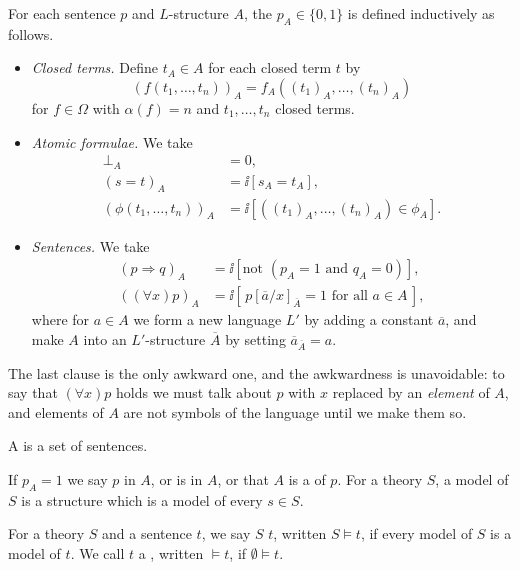 \documentclass[a4paper]{scrartcl}
\begin{document}
\begin{definition}[Interpretation]
  For each sentence $p$ and $L$-structure $A$, the  $p_A \in \{0, 1\}$ is defined inductively as follows.
  \begin{itemize}
    \item \emph{Closed terms.} Define $t_A \in A$ for each closed term $t$ by
    $$
    (f(t_1, \dots, t_n))_A = f_A((t_1)_A, \dots, (t_n)_A)
    $$
    for $f \in \Omega$ with $\alpha(f) = n$ and $t_1, \dots, t_n$ closed terms.
    \item \emph{Atomic formulae.} We take
    \begin{align*}
      \bot_A &= 0,\\
      (s = t)_A &= \ii[s_A = t_A],\\
      (\phi(t_1, \dots, t_n))_A &= \ii[((t_1)_A, \dots, (t_n)_A) \in \phi_A].
    \end{align*}
    \item \emph{Sentences.} We take
    \begin{align*}
      (p \Rightarrow q)_A &= \ii[\text{not } (p_A = 1 \text{ and } q_A = 0)], \\
      ((\forall x)p)_A &= \ii[\,p[\overline{a}/x]_{\overline{A}} = 1 \text{ for all } a\in A\,],
    \end{align*}
    where for $a \in A$ we form a new language $L'$ by adding a constant $\overline{a}$, and make $A$ into an $L'$-structure $\overline{A}$ by setting $\overline{a}_{\overline{A}} = a$.
  \end{itemize}
\end{definition}

The last clause is the only awkward one, and the awkwardness is unavoidable: to say that $(\forall x) p$ holds we must talk about $p$ with $x$ replaced by an \emph{element} of $A$, and elements of $A$ are not symbols of the language until we make them so.

\begin{definition}[Theory]
  A  is a set of sentences.
\end{definition}

\begin{definition}[Model]
  If $p_A = 1$ we say $p$  in $A$, or is  in $A$, or that $A$ is a  of $p$. For a theory $S$, a model of $S$ is a structure which is a model of every $s \in S$.
\end{definition}

\begin{definition}
  For a theory $S$ and a sentence $t$, we say $S$  $t$, written $S \models t$, if every model of $S$ is a model of $t$. We call $t$ a , written $\models t$, if $\emptyset \models t$.
\end{definition}
\end{document}
